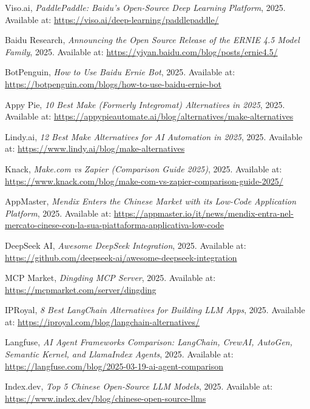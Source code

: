 \documentclass[11点, A4纸, 单面]{article}
\begin{document}
\begin{thebibliography}{99}
    Viso.ai, \textit{PaddlePaddle: Baidu's Open-Source Deep Learning Platform}, 2025. Available at: \url{https://viso.ai/deep-learning/paddlepaddle/}

    Baidu Research, \textit{Announcing the Open Source Release of the ERNIE 4.5 Model Family}, 2025. Available at: \url{https://yiyan.baidu.com/blog/posts/ernie4.5/}

    BotPenguin, \textit{How to Use Baidu Ernie Bot}, 2025. Available at: \url{https://botpenguin.com/blogs/how-to-use-baidu-ernie-bot}

    Appy Pie, \textit{10 Best Make (Formerly Integromat) Alternatives in 2025}, 2025. Available at: \url{https://appypieautomate.ai/blog/alternatives/make-alternatives}

    Lindy.ai, \textit{12 Best Make Alternatives for AI Automation in 2025}, 2025. Available at: \url{https://www.lindy.ai/blog/make-alternatives}

    Knack, \textit{Make.com vs Zapier (Comparison Guide 2025)}, 2025. Available at: \url{https://www.knack.com/blog/make-com-vs-zapier-comparison-guide-2025/}

    AppMaster, \textit{Mendix Enters the Chinese Market with its Low-Code Application Platform}, 2025. Available at: \url{https://appmaster.io/it/news/mendix-entra-nel-mercato-cinese-con-la-sua-piattaforma-applicativa-low-code}

    DeepSeek AI, \textit{Awesome DeepSeek Integration}, 2025. Available at: \url{https://github.com/deepseek-ai/awesome-deepseek-integration}

    MCP Market, \textit{Dingding MCP Server}, 2025. Available at: \url{https://mcpmarket.com/server/dingding}

    IPRoyal, \textit{8 Best LangChain Alternatives for Building LLM Apps}, 2025. Available at: \url{https://iproyal.com/blog/langchain-alternatives/}

    Langfuse, \textit{AI Agent Frameworks Comparison: LangChain, CrewAI, AutoGen, Semantic Kernel, and LlamaIndex Agents}, 2025. Available at: \url{https://langfuse.com/blog/2025-03-19-ai-agent-comparison}

    Index.dev, \textit{Top 5 Chinese Open-Source LLM Models}, 2025. Available at: \url{https://www.index.dev/blog/chinese-open-source-llms}


\end{thebibliography}
\end{document}
